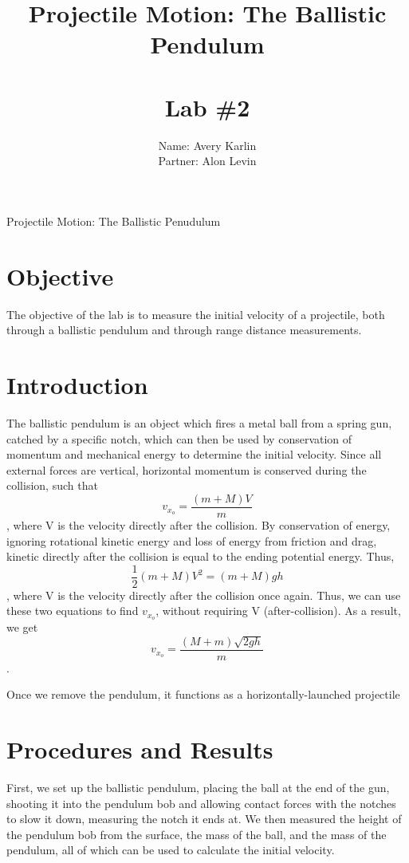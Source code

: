 \documentclass[11pt, titlepage]{article}
\title{Projectile Motion: The Ballistic Pendulum \\ \ \\ \large Lab \#2}
\author{Name: Avery Karlin \\ Partner: Alon Levin}
\date{}
\begin{document}
\maketitle

\begin{center}
\LARGE Projectile Motion: The Ballistic Penudulum
\end{center}

\section*{Objective}
The objective of the lab is to measure the initial velocity of a projectile, both through a ballistic pendulum and through range distance measurements. 
\section*{Introduction}
The ballistic pendulum is an object which fires a metal ball from a spring gun, catched by a specific notch, which can then be used by conservation of momentum and mechanical energy to determine the initial velocity. Since all external forces are vertical, horizontal momentum is conserved during the collision, such that $$v_{x_o} = \frac{(m + M)V}{m}$$, where V is the velocity directly after the collision. By conservation of energy, ignoring rotational kinetic energy and loss of energy from friction and drag, kinetic directly after the collision is equal to the ending potential energy. Thus, $$\frac{1}{2}(m + M)V^2 = (m + M)gh$$, where V is the velocity directly after the collision once again. Thus, we can use these two equations to find $v_{x_o}$, without requiring V (after-collision). As a result, we get $$v_{x_o} = \frac{(M+m)\sqrt{2gh}}{m}$$.

Once we remove the pendulum, it functions as a horizontally-launched projectile %

\section*{Procedures and Results}

First, we set up the ballistic pendulum, placing the ball at the end of the gun, shooting it into the pendulum bob and allowing contact forces with the notches to slow it down, measuring the notch it ends at. We then measured the height of the pendulum bob from the surface, the mass of the ball, and the mass of the pendulum, all of which can be used to calculate the initial velocity.
\end{document}
